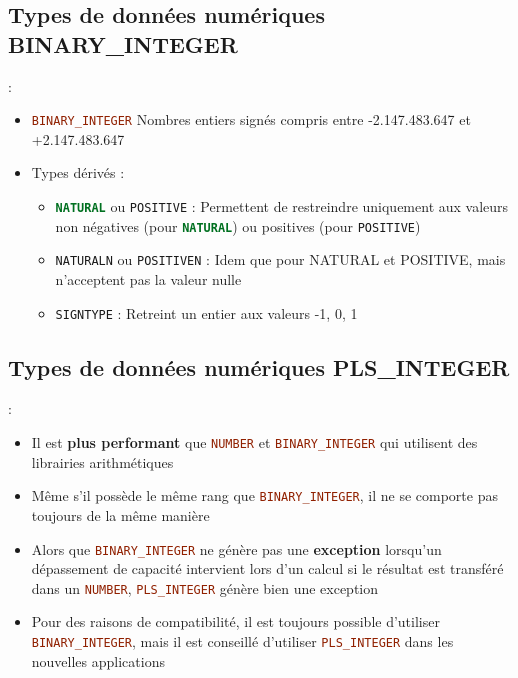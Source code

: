 \documentclass[10pt]{beamer}
\begin{document}
\subsection{Types de données numériques BINARY\_INTEGER}
\begin{frame}{\secname : \subsecname}
    \begin{itemize}
        \item \lstinline[language=sql]!BINARY_INTEGER! Nombres entiers signés compris entre -2.147.483.647 et +2.147.483.647
        \item Types dérivés :
              \begin{itemize}
                  \item \lstinline[language=sql]!NATURAL! ou \lstinline[language=sql]!POSITIVE! : Permettent de restreindre uniquement aux valeurs non négatives (pour \lstinline[language=sql]!NATURAL!) ou positives (pour \lstinline[language=sql]!POSITIVE!)
                  \item \lstinline[language=sql]!NATURALN! ou \lstinline[language=sql]!POSITIVEN! : Idem que pour NATURAL et POSITIVE, mais n'acceptent pas la valeur nulle
                  \item \lstinline[language=sql]!SIGNTYPE! : Retreint un entier aux valeurs -1, 0, 1
              \end{itemize}
    \end{itemize}
\end{frame}

\subsection{Types de données numériques PLS\_INTEGER}
\begin{frame}{\secname : \subsecname}
    \begin{itemize}
        \item Il est \textbf{plus performant} que \lstinline[language=sql]!NUMBER! et \lstinline[language=sql]!BINARY_INTEGER! qui utilisent des librairies arithmétiques
        \item Même s'il possède le même rang que \lstinline[language=sql]!BINARY_INTEGER!, il ne se comporte pas toujours de la même manière
        \item Alors que \lstinline[language=sql]!BINARY_INTEGER! ne génère pas une \textbf{exception} lorsqu'un dépassement de capacité intervient lors d'un calcul si le résultat est transféré dans un \lstinline[language=sql]!NUMBER!, \lstinline[language=sql]!PLS_INTEGER! génère bien une exception
        \item Pour des raisons de compatibilité, il est toujours possible d'utiliser \lstinline[language=sql]!BINARY_INTEGER!, mais il est conseillé d'utiliser \lstinline[language=sql]!PLS_INTEGER! dans les nouvelles applications

    \end{itemize}
\end{frame}
\end{document}
